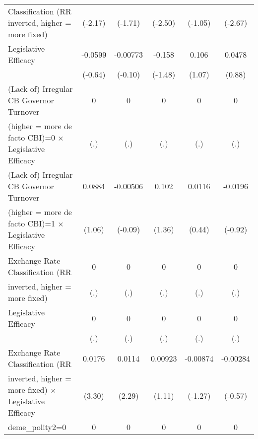{\begin{tabular}{l*{5}{c}}
Classification (RR inverted, higher = more fixed)&  (-2.17)         &  (-1.71)         &  (-2.50)         &  (-1.05)         &  (-2.67)         \\
\addlinespace
Legislative Efficacy                    &  -0.0599         & -0.00773         &   -0.158         &    0.106         &   0.0478         \\
                                        &  (-0.64)         &  (-0.10)         &  (-1.48)         &   (1.07)         &   (0.88)         \\
\addlinespace
(Lack of) Irregular CB Governor Turnover&        0         &        0         &        0         &        0         &        0         \\
(higher = more de facto CBI)=0 $\times$ Legislative Efficacy&      (.)         &      (.)         &      (.)         &      (.)         &      (.)         \\
\addlinespace
(Lack of) Irregular CB Governor Turnover&   0.0884         & -0.00506         &    0.102         &   0.0116         &  -0.0196         \\
(higher = more de facto CBI)=1 $\times$ Legislative Efficacy&   (1.06)         &  (-0.09)         &   (1.36)         &   (0.44)         &  (-0.92)         \\
\addlinespace
Exchange Rate Classification (RR        &        0         &        0         &        0         &        0         &        0         \\
inverted, higher = more fixed)          &      (.)         &      (.)         &      (.)         &      (.)         &      (.)         \\
\addlinespace
Legislative Efficacy                    &        0         &        0         &        0         &        0         &        0         \\
                                        &      (.)         &      (.)         &      (.)         &      (.)         &      (.)         \\
\addlinespace
Exchange Rate Classification (RR        &   0.0176\sym{**} &   0.0114\sym{*}  &  0.00923         & -0.00874         & -0.00284         \\
inverted, higher = more fixed) $\times$ Legislative Efficacy&   (3.30)         &   (2.29)         &   (1.11)         &  (-1.27)         &  (-0.57)         \\
\addlinespace
deme\_polity2=0                          &        0         &        0         &        0         &        0         &        0         \\

\end{tabular}}
